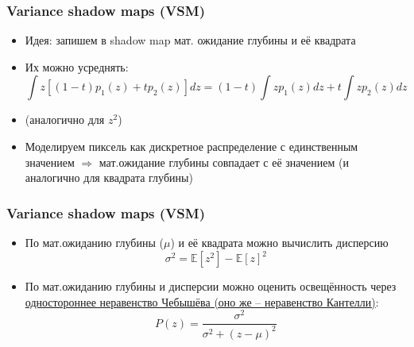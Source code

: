 \documentclass{beamer}
\begin{document}
\begin{frame}[fragile]
\frametitle{Variance shadow maps (VSM)}
\begin{itemize}
\item Идея: запишем в shadow map мат. ожидание глубины и её квадрата
\pause
\item Их можно усреднять:
\begin{equation}
\int z \left[(1-t)p_1(z) + tp_2(z)\right] dz = (1-t)\int z p_1(z) dz + t\int z p_2(z) dz
\end{equation}
\item (аналогично для \begin{math}z^2\end{math})
\pause
\item Моделируем пиксель как дискретное распределение с единственным значением \begin{math}\Rightarrow\end{math} мат.ожидание глубины совпадает с её значением (и аналогично для квадрата глубины)
\end{itemize}
\end{frame}

\begin{frame}[fragile]
\frametitle{Variance shadow maps (VSM)}
\begin{itemize}
\item По мат.ожиданию глубины (\begin{math}\mu\end{math}) и её квадрата можно вычислить дисперсию
\begin{equation}
\sigma^2 = \mathbb{E}[z^2] - \mathbb{E}[z]^2
\end{equation}
\pause
\item По мат.ожиданию глубины и дисперсии можно оценить освещённость через \href{https://en.wikipedia.org/wiki/Cantelli%27s_inequality}{одностороннее неравенство Чебышёва (оно же -- неравенство Кантелли)}:
\begin{equation}
P(z) = \frac{\sigma^2}{\sigma^2 + (z - \mu)^2}
\end{equation}
\end{itemize}
\end{frame}
\end{document}
